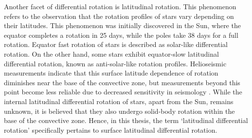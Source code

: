 
Another facet of differential rotation is latitudinal rotation.
This phenomenon refers to the observation that the rotation profiles of stars vary depending on their latitudes. 
This phenomenon was initially discovered in the Sun, where the equator completes a rotation in 25 days, while the poles take 38 days for a full rotation. 
Equator fast rotation of stars is described as solar-like differential rotation.
On the other hand, some stars exhibit equator-slow latitudinal differential rotation, known as anti-solar-like rotation profiles.
Helioseismic measurements indicate that this surface latitude dependence of rotation diminishes near the base of the convective zone, but measurements beyond this point become less reliable due to decreased sensitivity in seismology \citep{howe_solar_2009}.
While the internal latitudinal differential rotation of stars, apart from the Sun, remains unknown, it is believed that they also undergo solid-body rotation within the base of the convective zone. Hence, in this thesis, the term `latitudinal differential rotation' specifically pertains to surface latitudinal differential rotation.

